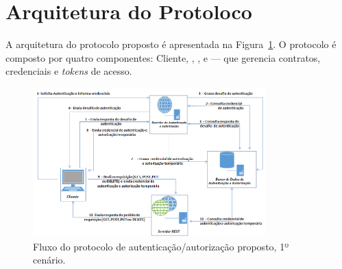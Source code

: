 
\section{Arquitetura do Protoloco}\label{sec:ArqProtocolo}

A arquitetura do protocolo proposto é apresentada na Figura~\ref{fig:arquiteturaprotocolo}. O protocolo é composto por quatro componentes: Cliente, 
\servidorAA, \servidorRest, e \servidorBD--- que gerencia contratos, credenciais e \emph{tokens} de acesso.

\begin{figure}[!htb]
    \centering
    \includegraphics[width=0.8\textwidth]{arquitetura_protocolo.png}
    \caption{Fluxo do protocolo de autenticação/autorização proposto, 1º cenário.}
    \label{fig:arquiteturaprotocolo}
\end{figure}

